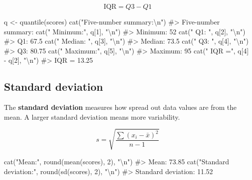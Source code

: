 \documentclass[
  11pt,
  a4paper,
  oneside,
  open=any]{scrbook}
\newenvironment{Shaded}{\begin{snugshade}}{\end{snugshade}}
\newcommand{\CommentTok}[1]{\textcolor[rgb]{0.37,0.37,0.37}{#1}}
\newcommand{\DecValTok}[1]{\textcolor[rgb]{0.68,0.00,0.00}{#1}}
\newcommand{\FunctionTok}[1]{\textcolor[rgb]{0.28,0.35,0.67}{#1}}
\newcommand{\NormalTok}[1]{\textcolor[rgb]{0.00,0.23,0.31}{#1}}
\newcommand{\OtherTok}[1]{\textcolor[rgb]{0.00,0.23,0.31}{#1}}
\newcommand{\SpecialCharTok}[1]{\textcolor[rgb]{0.37,0.37,0.37}{#1}}
\newcommand{\StringTok}[1]{\textcolor[rgb]{0.13,0.47,0.30}{#1}}
\begin{document}
\[\text{IQR} = Q3 - Q1\]

\begin{Shaded}
\begin{Highlighting}[]
\NormalTok{q }\OtherTok{\textless{}{-}} \FunctionTok{quantile}\NormalTok{(scores)}
\FunctionTok{cat}\NormalTok{(}\StringTok{"Five{-}number summary:}\SpecialCharTok{\textbackslash{}n}\StringTok{"}\NormalTok{)}
\CommentTok{\#\textgreater{} Five{-}number summary:}
\FunctionTok{cat}\NormalTok{(}\StringTok{"  Minimum:"}\NormalTok{, q[}\DecValTok{1}\NormalTok{], }\StringTok{"}\SpecialCharTok{\textbackslash{}n}\StringTok{"}\NormalTok{)}
\CommentTok{\#\textgreater{}   Minimum: 52}
\FunctionTok{cat}\NormalTok{(}\StringTok{"  Q1:     "}\NormalTok{, q[}\DecValTok{2}\NormalTok{], }\StringTok{"}\SpecialCharTok{\textbackslash{}n}\StringTok{"}\NormalTok{)}
\CommentTok{\#\textgreater{}   Q1:      67.5}
\FunctionTok{cat}\NormalTok{(}\StringTok{"  Median: "}\NormalTok{, q[}\DecValTok{3}\NormalTok{], }\StringTok{"}\SpecialCharTok{\textbackslash{}n}\StringTok{"}\NormalTok{)}
\CommentTok{\#\textgreater{}   Median:  73.5}
\FunctionTok{cat}\NormalTok{(}\StringTok{"  Q3:     "}\NormalTok{, q[}\DecValTok{4}\NormalTok{], }\StringTok{"}\SpecialCharTok{\textbackslash{}n}\StringTok{"}\NormalTok{)}
\CommentTok{\#\textgreater{}   Q3:      80.75}
\FunctionTok{cat}\NormalTok{(}\StringTok{"  Maximum:"}\NormalTok{, q[}\DecValTok{5}\NormalTok{], }\StringTok{"}\SpecialCharTok{\textbackslash{}n}\StringTok{"}\NormalTok{)}
\CommentTok{\#\textgreater{}   Maximum: 95}
\FunctionTok{cat}\NormalTok{(}\StringTok{"  IQR ="}\NormalTok{, q[}\DecValTok{4}\NormalTok{] }\SpecialCharTok{{-}}\NormalTok{ q[}\DecValTok{2}\NormalTok{], }\StringTok{"}\SpecialCharTok{\textbackslash{}n}\StringTok{"}\NormalTok{)}
\CommentTok{\#\textgreater{}   IQR = 13.25}
\end{Highlighting}
\end{Shaded}

\subsection{Standard deviation}\label{standard-deviation}

The \textbf{standard deviation} measures how spread out data values are
from the mean. A larger standard deviation means more variability.

\[s = \sqrt{\frac{\sum (x_i - \bar{x})^2}{n - 1}}\]

\begin{Shaded}
\begin{Highlighting}[]
\FunctionTok{cat}\NormalTok{(}\StringTok{"Mean:"}\NormalTok{, }\FunctionTok{round}\NormalTok{(}\FunctionTok{mean}\NormalTok{(scores), }\DecValTok{2}\NormalTok{), }\StringTok{"}\SpecialCharTok{\textbackslash{}n}\StringTok{"}\NormalTok{)}
\CommentTok{\#\textgreater{} Mean: 73.85}
\FunctionTok{cat}\NormalTok{(}\StringTok{"Standard deviation:"}\NormalTok{, }\FunctionTok{round}\NormalTok{(}\FunctionTok{sd}\NormalTok{(scores), }\DecValTok{2}\NormalTok{), }\StringTok{"}\SpecialCharTok{\textbackslash{}n}\StringTok{"}\NormalTok{)}
\CommentTok{\#\textgreater{} Standard deviation: 11.52}
\end{Highlighting}
\end{Shaded}
\end{document}
